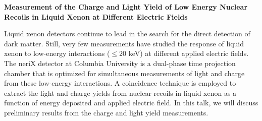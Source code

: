 \documentclass[12pt,a4paper]{article}
\begin{document}
\begin{center}
\textbf{Measurement of the Charge and Light Yield of Low Energy Nuclear Recoils in Liquid Xenon at Different Electric Fields}

Liquid xenon detectors continue to lead in the search for the direct detection of dark matter.  Still, very few measurements have studied the response of liquid xenon to low-energy interactions ($\leq 20$ keV) at different applied electric fields.  The neriX detector at Columbia University is a dual-phase time projection chamber that is optimized for simultaneous measurements of light and charge from these low-energy interactions.  A coincidence technique is employed to extract the light and charge yields from nuclear recoils in liquid xenon as a function of energy deposited and applied electric field.  In this talk, we will discuss preliminary results from the charge and light yield measurements.
\end{center}
\end{document}
